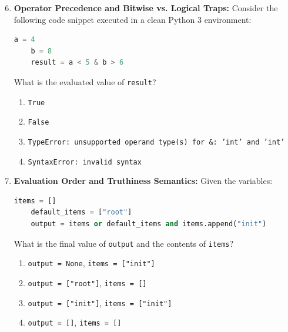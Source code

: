 \begin{enumerate}
    \setcounter{enumi}{5}
    \item \textbf{Operator Precedence and Bitwise vs. Logical Traps:}
    Consider the following code snippet executed in a clean Python 3 environment:
    \begin{lstlisting}[language=Python]
    a = 4
    b = 8
    result = a < 5 & b > 6
    \end{lstlisting}
    What is the evaluated value of \texttt{result}?
    \begin{enumerate}
        \item \texttt{True}
        \item \texttt{False}
        \item \texttt{TypeError: unsupported operand type(s) for \&: 'int' and 'int'}
        \item \texttt{SyntaxError: invalid syntax}
    \end{enumerate}

    \item \textbf{Evaluation Order and Truthiness Semantics:}
    Given the variables:
    \begin{lstlisting}[language=Python]
    items = []
    default_items = ["root"]
    output = items or default_items and items.append("init")
    \end{lstlisting}
    What is the final value of \texttt{output} and the contents of \texttt{items}?
    \begin{enumerate}
        \item \texttt{output = None}, \quad \texttt{items = ["init"]}
        \item \texttt{output = ["root"]}, \quad \texttt{items = []}
        \item \texttt{output = ["init"]}, \quad \texttt{items = ["init"]}
        \item \texttt{output = []}, \quad \texttt{items = []}
    \end{enumerate}
\end{enumerate}
